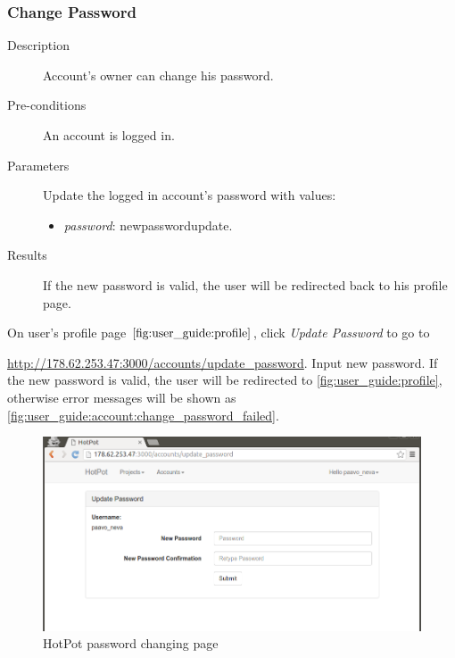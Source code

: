 \subsubsection{Change Password}
\label{ch:appendix-a:user_guide:account:change_password}

\begin{description}
\item[Description] Account's owner can change his password.
\item[Pre-conditions] An account is logged in.
\item[Parameters] Update the logged in account's password with values:
\begin{itemize}
\item \emph{password}: newpasswordupdate.
\end{itemize}
\item[Results] If the new password is valid, the user will be redirected back to his profile page.
\end{description}

On user's profile page \(\autoref{fig:user_guide:profile}\), click \emph{Update Password} to go to 

\noindent\href{http://178.62.253.47:3000/accounts/update\_password}{http://178.62.253.47:3000/accounts/update\_password}.
Input new password.
If the new password is valid, the user will be redirected to \autoref{fig:user_guide:profile}, otherwise error messages will be shown as \autoref{fig:user_guide:account:change_password_failed}.

\begin{figure}[bth]
\myfloatalign
\includegraphics[width=1.0\linewidth]{gfx/chapter_5/account/change_password}
\caption[HotPot password changing page]{HotPot password changing page}
\label{fig:user_guide:account:change_password}
\end{figure}

